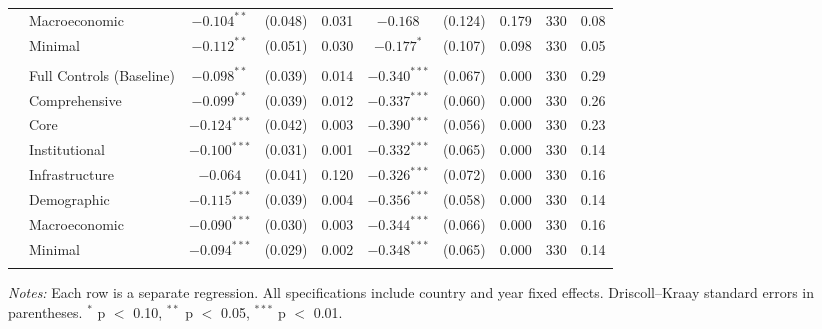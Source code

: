 \begin{table}[p]
\begin{minipage}{\textwidth}
\begin{adjustbox}{width=\textwidth}
\begin{tabular}{llcccccccc}
 & Macroeconomic & $-0.104^{**}$ & (0.048) & 0.031 & $-0.168$ & (0.124) & 0.179 & 330 & 0.08 \\
 & Minimal & $-0.112^{**}$ & (0.051) & 0.030 & $-0.177^{*}$ & (0.107) & 0.098 & 330 & 0.05 \\
\addlinespace
\multicolumn{10}{l}{\textit{Price: USD}} \\
 & Full Controls (Baseline) & $-0.098^{**}$ & (0.039) & 0.014 & $-0.340^{***}$ & (0.067) & 0.000 & 330 & 0.29 \\
 & Comprehensive & $-0.099^{**}$ & (0.039) & 0.012 & $-0.337^{***}$ & (0.060) & 0.000 & 330 & 0.26 \\
 & Core & $-0.124^{***}$ & (0.042) & 0.003 & $-0.390^{***}$ & (0.056) & 0.000 & 330 & 0.23 \\
 & Institutional & $-0.100^{***}$ & (0.031) & 0.001 & $-0.332^{***}$ & (0.065) & 0.000 & 330 & 0.14 \\
 & Infrastructure & $-0.064$ & (0.041) & 0.120 & $-0.326^{***}$ & (0.072) & 0.000 & 330 & 0.16 \\
 & Demographic & $-0.115^{***}$ & (0.039) & 0.004 & $-0.356^{***}$ & (0.058) & 0.000 & 330 & 0.14 \\
 & Macroeconomic & $-0.090^{***}$ & (0.030) & 0.003 & $-0.344^{***}$ & (0.066) & 0.000 & 330 & 0.16 \\
 & Minimal & $-0.094^{***}$ & (0.029) & 0.002 & $-0.348^{***}$ & (0.065) & 0.000 & 330 & 0.14 \\
\addlinespace
\bottomrule
\end{tabular}
\end{adjustbox}
\par\vspace{4pt}
\small
\textit{Notes:} Each row is a separate regression. All specifications include country
and year fixed effects. Driscoll--Kraay standard errors in parentheses.
$^{*}$ p $<$ 0.10, $^{**}$ p $<$ 0.05, $^{***}$ p $<$ 0.01.
\end{minipage}
\end{table}
